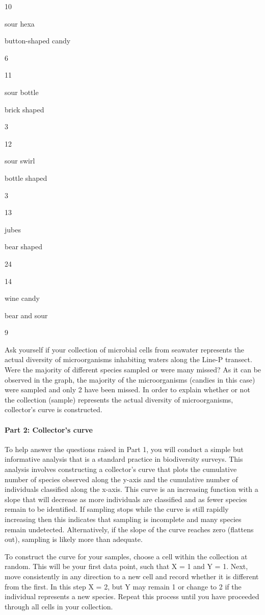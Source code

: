 \documentclass[]{article}
\let\oldparagraph\paragraph
\renewcommand{\paragraph}[1]{\oldparagraph{#1}\mbox{}}
\begin{document}
10

sour hexa

button-shaped candy

6

11

sour bottle

brick shaped

3

12

sour swirl

bottle shaped

3

13

jubes

bear shaped

24

14

wine candy

bear and sour

9

Ask yourself if your collection of microbial cells from seawater
represents the actual diversity of microorganisms inhabiting waters
along the Line-P transect. Were the majority of different species
sampled or were many missed? As it can be observed in the graph, the
majority of the microorganisms (candies in this case) were sampled and
only 2 have been missed. In order to explain whether or not the
collection (sample) represents the actual diversity of microorganisms,
collector's curve is constructed.

\paragraph{Part 2: Collector's curve}\label{part-2-collectors-curve}

To help answer the questions raised in Part 1, you will conduct a simple
but informative analysis that is a standard practice in biodiversity
surveys. This analysis involves constructing a collector's curve that
plots the cumulative number of species observed along the y-axis and the
cumulative number of individuals classified along the x-axis. This curve
is an increasing function with a slope that will decrease as more
individuals are classified and as fewer species remain to be identified.
If sampling stops while the curve is still rapidly increasing then this
indicates that sampling is incomplete and many species remain
undetected. Alternatively, if the slope of the curve reaches zero
(flattens out), sampling is likely more than adequate.

To construct the curve for your samples, choose a cell within the
collection at random. This will be your first data point, such that X =
1 and Y = 1. Next, move consistently in any direction to a new cell and
record whether it is different from the first. In this step X = 2, but Y
may remain 1 or change to 2 if the individual represents a new species.
Repeat this process until you have proceeded through all cells in your
collection.
\end{document}
